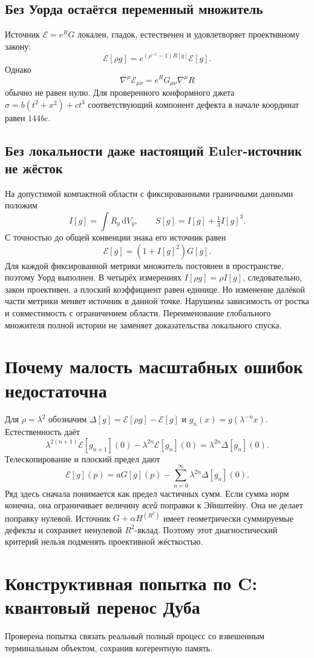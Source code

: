 \documentclass[11pt,a4paper]{article}
\newcommand{\E}{\mathcal E}
\newcommand{\dd}{\mathrm d}
\begin{document}
\subsection{Без Уорда остаётся переменный множитель}
Источник $\E=e^RG$ локален, гладок, естественен и удовлетворяет проективному закону:
\[
\E[\rho g]=e^{(\rho^{-1}-1)R[g]}\E[g].
\]
Однако
\[
\nabla^\mu\E_{\mu\nu}=e^RG_{\mu\nu}\nabla^\mu R
\]
обычно не равен нулю. Для проверенного конформного джета
$\sigma=b(t^2+x^2)+ct^3$ соответствующий компонент дефекта в начале координат равен $144bc$.

\subsection{Без локальности даже настоящий Euler-источник не жёсток}
На допустимой компактной области с фиксированными граничными данными положим
\[
I[g]=\int R_g\,\dd V_g,\qquad
S[g]=I[g]+\tfrac13 I[g]^3.
\]
С точностью до общей конвенции знака его источник равен
\[
\E[g]=(1+I[g]^2)G[g].
\]
Для каждой фиксированной метрики множитель постоянен в пространстве, поэтому Уорд выполнен. В четырёх измерениях $I[\rho g]=\rho I[g]$, следовательно, закон проективен, а плоский коэффициент равен единице. Но изменение далёкой части метрики меняет источник в данной точке. Нарушены зависимость от ростка и совместимость с ограничением области. Переименование глобального множителя полной истории не заменяет доказательства локального спуска.

\section{Почему малость масштабных ошибок недостаточна}
Для $\rho=\lambda^2$ обозначим
$\Delta[g]=\E[\rho g]-\E[g]$ и $g_n(x)=g(\lambda^{-n}x)$.
Естественность даёт
\[
\lambda^{2(n+1)}\E[g_{n+1}](0)
-\lambda^{2n}\E[g_n](0)
=\lambda^{2n}\Delta[g_n](0).
\]
Телескопирование и плоский предел дают
\[
\boxed{\E[g](p)=aG[g](p)
-\sum_{n=0}^{\infty}\lambda^{2n}\Delta[g_n](0).}
\]
Ряд здесь сначала понимается как предел частичных сумм. Если сумма норм конечна, она ограничивает величину \emph{всей} поправки к Эйнштейну. Она не делает поправку нулевой. Источник $G+\alpha H^{(R^2)}$ имеет геометрически суммируемые дефекты и сохраняет ненулевой $R^2$-вклад. Поэтому этот диагностический критерий нельзя подменять проективной жёсткостью.

\section{Конструктивная попытка по C: квантовый перенос Дуба}
Проверена попытка связать реальный полный процесс со взвешенным терминальным объектом, сохранив когерентную память.
\end{document}
